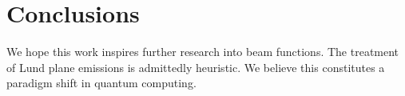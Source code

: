 \section{Conclusions}\label{sec:conclusions}

We hope this work inspires further research into beam functions. The
treatment of Lund plane emissions is admittedly heuristic. We believe
this constitutes a paradigm shift in quantum computing.

